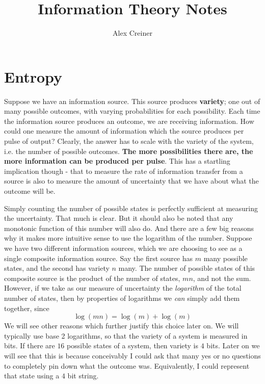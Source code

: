 \documentclass{article}
\title{Information Theory Notes}
\author{Alex Creiner}
\theoremstyle{definition}
\theoremstyle{plain}
\begin{document}
\maketitle
\section{Entropy}
\par Suppose we have an information source. This source produces \textbf{variety}; one out of many possible outcomes, with varying probabilities for each possibility. Each time the information source produces an outcome, we are receiving information. How could one measure the amount of information which the source produces per pulse of output? Clearly, the answer has to scale with the variety of the system, i.e. the number of possible outcomes. \textbf{The more possibilities there are, the more information can be produced per pulse}. This has a startling implication though - that to measure the rate of information transfer from a source is also to measure the amount of uncertainty that we have about what the outcome will be. \par 
Simply counting the number of possible states is perfectly sufficient at measuring the uncertainty. That much is clear. But it should also be noted that any monotonic function of this number will also do. And there are a few big reasons why it makes more intuitive sense to use the logarithm of the number. Suppose we have two different information sources, which we are choosing to see as a single composite information source. Say the first source has $m$ many possible states, and the second has variety $n$ many. The number of possible states of this composite source is the product of the number of states, $mn$, and not the sum. However, if we take as our measure of uncertainty the \emph{logarithm} of the total number of states, then by properties of logarithms we \emph{can} simply add them together, since
\[ \log(mn) = \log(m)+\log(m) \]
We will see other reasons which further justify this choice later on. We will typically use base 2 logarithms, so that the variety of a system is measured in bits. If there are $16$ possible states of a system, then variety is $4$ bits. Later on we will see that this is because conceivably I could ask that many yes or no questions to completely pin down what the outcome was. Equivalently, I could represent that state using a $4$ bit string. \par 
\end{document}
